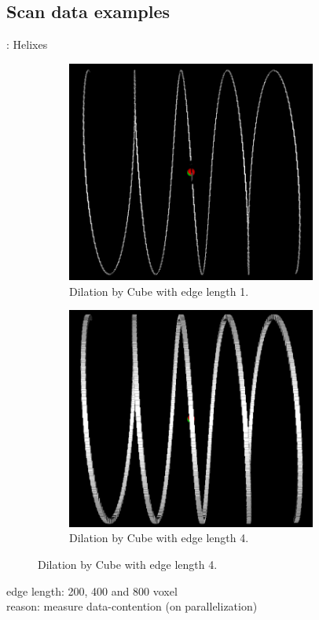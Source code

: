 \documentclass{beamer}
\begin{document}
\subsection{Scan data examples}
\begin{frame}{\insertsubsection: Helixes}
\begin{figure}[h]
\centering
  \begin{subfigure}[t]{0.5\textwidth}
    \centering
  \vskip 0pt
    \includegraphics[width=0.9\textwidth]{images/helixd1_800.png}
    \caption{Dilation by Cube with edge length 1.}\label{fig:helixd1_800}
  \end{subfigure}%
  \begin{subfigure}[t]{0.5\textwidth}
    \centering
  \vskip 0pt
    \includegraphics[width=0.9\textwidth]{images/helixd4_800.png}
    \caption{Dilation by Cube with edge length 4.}\label{fig:helixd4_800}
  \end{subfigure}%
\end{figure}
  edge length: 200, 400 and 800 voxel\\
  reason: measure data-contention (on parallelization) 
\end{frame}
\end{document}
